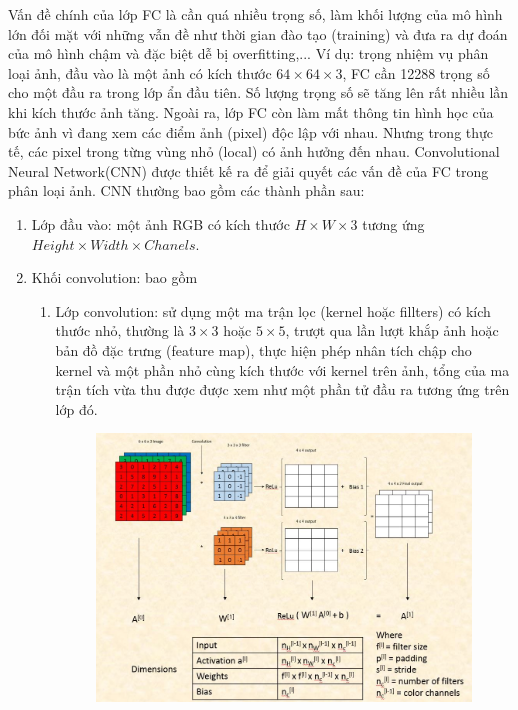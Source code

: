 Vấn đề chính của lớp FC là cần quá nhiều trọng số, làm khối lượng của mô hình lớn đối mặt với những vẫn đề như thời gian đào tạo (training) và đưa ra dự đoán của mô hình chậm và đặc biệt dễ bị overfitting,...
Ví dụ: trọng nhiệm vụ phân loại ảnh, đầu vào là một ảnh có kích thước $64\times64\times3$, FC cần 12288 trọng số cho một đầu ra trong lớp ẩn đầu tiên. Số lượng trọng số sẽ tăng lên rất nhiều lần khi kích thước ảnh tăng.
Ngoài ra, lớp FC còn làm mất thông tin hình học của bức ảnh vì đang xem các điểm ảnh (pixel) độc lập với nhau. Nhưng trong thực tế, các pixel trong từng vùng nhỏ (local) có ảnh hưởng đến nhau. 
Convolutional Neural Network(CNN) được thiết kế ra để giải quyết các vấn đề của FC trong phân loại ảnh.
CNN thường bao gồm các thành phần sau:
\begin{enumerate}
	\item Lớp đầu vào: một ảnh RGB có kích thước $H \times W \times 3$  tương ứng $Height \times Width \times Chanels$.
	\item Khối convolution: bao gồm
	\begin{enumerate}
		\item Lớp convolution: sử dụng một ma trận lọc (kernel hoặc fillters) có kích thước nhỏ, thường là $3\times 3$ hoặc $5\times5$, trượt qua lần lượt khắp ảnh hoặc bản đồ đặc trưng (feature map), thực hiện phép nhân tích chập cho kernel và một phần nhỏ cùng kích thước với kernel trên ảnh, tổng của ma trận tích vừa thu được được xem như một phần tử đầu ra tương ứng trên lớp đó.
		\begin{figure}[h]
			\begin{center}
				\includegraphics[height=.28\textheight]{Chuong2/Figs/Convolution-Layer-Dimensions.jpg}

\end{center}
\end{figure}
\end{enumerate}
\end{enumerate}
